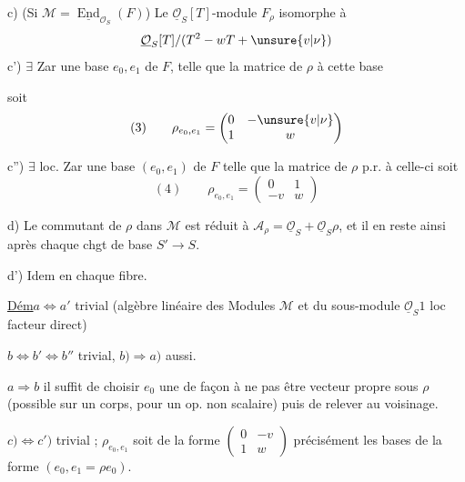 c) (Si $\mathcal M=\underline{\operatorname{End}}_{\mathcal O_S}(F)$) Le $\underline{\mathcal O}_S[T]$-module $F_\rho$  isomorphe à
\[
\underline{\mathcal O}_S[T]/(T^2-wT+\unsure{v|\nu})
\]
c')  $\exists$  Zar une base $e_0,e_1$ de $F$, telle que la matrice de $\rho$  à cette base


soit
\[
(3)\qquad \rho_{e_0,e_1}=\begin{pmatrix}0&-\unsure{v|\nu}\\1&w\end{pmatrix}
\]

c'') 
$\exists$ loc. Zar une base $(e_0,e_1)$ de $F$ telle que la matrice de $\rho$ p.r. à celle-ci soit
\[
(4)\qquad \rho_{e_0,e_1}=\begin{pmatrix}0&1\\-v&w\end{pmatrix}
\]

d) Le commutant de $\rho$ dans $\mathcal M$ est réduit à
$\mathcal A_\rho=\underline{\mathcal O}_S+\underline{\mathcal O}_S\rho$, et il en reste ainsi après chaque chgt de base $S'\to S$.

d') Idem en chaque fibre.

\uline{Dém}\quad $a\Longleftrightarrow a'$ trivial (algèbre linéaire des Modules $\mathcal M$ et du sous-module $\underline{\mathcal O}_S1$ loc facteur direct)

$b\Longleftrightarrow b'\Longleftrightarrow b''$ trivial, $b)\Longrightarrow a)$ aussi.

$a\Longrightarrow b$ il suffit de choisir $e_0$  une  de façon à ne pas être vecteur propre sous $\rho$ (possible sur un corps, pour un op. non scalaire) puis de relever au voisinage.

$c)\Longleftrightarrow c')$ trivial ; 
$\rho_{e_0,e_1}$ soit de la forme $\begin{pmatrix}0&-v\\1&w\end{pmatrix}$  précisément les bases de la forme $(e_0,e_1=\rho e_0)$.

